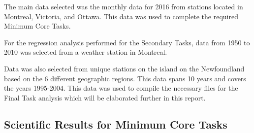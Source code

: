 \documentclass{article}
\begin{document}
\noindent The main data selected was the monthly data for 2016 from stations located in Montreal, Victoria, and Ottawa. This data was used to complete the required Minimum Core Tasks.

\noindent For the regression analysis performed for the Secondary Tasks, data from 1950 to 2010 was selected from a weather station in Montreal.

\noindent Data was also selected from unique stations on the island on the Newfoundland based on the 6 different geographic regions. This data spans 10 years and covers the years 1995-2004. This data was used to compile the necessary files for the Final Task analysis which will be elaborated further in this report. 


\subsection{ \bf Scientific Results for Minimum Core Tasks}
\end{document}
